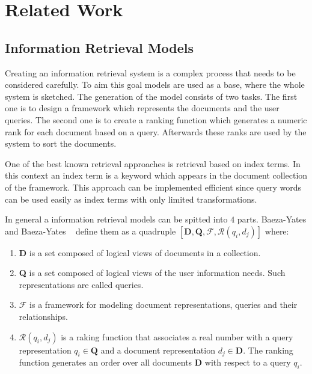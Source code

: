 \chapter{Related Work}
\label{cha:related_work}

\section{Information Retrieval Models}
\label{sec:information_retrieval_models}

Creating an information retrieval system is a complex process that needs to be considered carefully. To aim this goal models are used as a base, where the whole system is sketched. The generation of the model consists of two tasks. The first one is to design a framework which represents the documents and the user queries. The second one is to create a ranking function which generates a numeric rank for each document based on a query. Afterwards these ranks are used by the system to sort the documents.

One of the best known retrieval approaches is retrieval based on index terms. In this context an index term is a keyword which appears in the document collection of the framework. This approach can be implemented efficient since query words can be used easily as index terms with only limited transformations.

In general a information retrieval models can be spitted into $4$ parts. Baeza-Yates and Baeza-Yates ~\cite{ModernInvormationRetrieval1999} define them as a quadruple $[\textbf{D}, \textbf{Q}, \mathcal{F}, \mathcal{R}(q_i, d_j)]$ where:

\begin{enumerate}
  \item \textbf{D} is a set composed of logical views of documents in a collection.
  \item \textbf{Q} is a set composed of logical views of the user information needs. Such representations are called queries.
  \item $\mathcal{F}$ is a framework for modeling document representations, queries and their relationships.
  \item $\mathcal{R}(q_i, d_j)$ is a raking function that associates a real number with a query representation $q_i \in \textbf{Q}$ and a document representation $d_j \in \textbf{D}$. The ranking function generates an order over all documents \textbf{D} with respect to a query $q_i$.
\end{enumerate}

